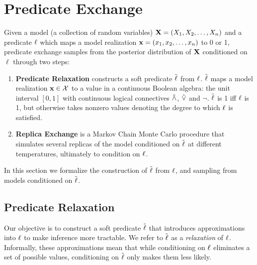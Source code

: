 \section{Predicate Exchange}

Given a model (a collection of random variables)  $\mathbf{X} = (X_1, X_2, \dots, X_n)$ and a predicate $\operatorname{\ell}$ which maps a model realization  $\mathbf{x} = (x_1, x_2, \dots, x_n)$ to 0 or 1, predicate exchange samples from the posterior distribution of $\mathbf{X}$ conditioned on $\ell$ through two steps:
\begin{enumerate}
\item \textbf{Predicate Relaxation} constructs a soft predicate $\mathrel{\tilde{\operatorname{\ell}}}$ from $\operatorname{\ell}$. $\mathrel{\tilde{\operatorname{\ell}}}$ maps a model realization $\mathbf{x} \in {\mathcal{X}}$ to a value in a continuous Boolean algebra: the unit interval $[0, 1]$ with continuous logical connectives $\mathrel{\tilde{\land}}$, $\mathrel{\tilde{\lor}}$ and $\neg$.
$\mathrel{\tilde{\operatorname{\ell}}}$ is 1 iff $\operatorname{\ell}$ is 1, but otherwise takes nonzero values denoting the degree to which $\operatorname{\ell}$ is satisfied.
\item  \textbf{Replica Exchange} is a Markov Chain Monte Carlo procedure that simulates several replicas  of the model conditioned on $\mathrel{\tilde{\operatorname{\ell}}}$ at different temperatures, ultimately to condition on $\operatorname{\ell}$. 
\end{enumerate}

In this section we formalize the construction of $\mathrel{\tilde{\operatorname{\ell}}}$ from $\operatorname{\ell}$, and sampling from models conditioned on $\mathrel{\tilde{\operatorname{\ell}}}$.

\subsection{Predicate Relaxation}\label{predexchange}

Our objective is to construct a soft predicate $\mathrel{\tilde{\operatorname{\ell}}}$ that introduces approximations into $\operatorname{\ell}$ to make inference more tractable.
We refer to $\mathrel{\tilde{\operatorname{\ell}}}$ as a \emph{relaxation} of $\operatorname{\ell}$.
Informally, these approximations mean that while conditioning on $\operatorname{\ell}$ eliminates a set of possible values, conditioning on $\mathrel{\tilde{\operatorname{\ell}}}$ only makes them less likely.

